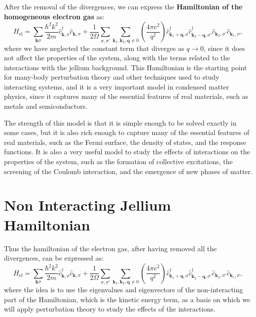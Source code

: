 After the removal of the divergences, we can express the \textbf{Hamiltonian of the homogeneous electron gas} as:
\[
    H_{\text{el}} = \sum_{\mathbf{k} \sigma} \frac{\hbar^2 k^2}{2m} \hat{c}_{\mathbf{k}, \sigma}^\dagger \hat{c}_{\mathbf{k}, \sigma} + \frac{1}{2\Omega} \sum_{\sigma, \sigma'} \sum_{\mathbf{k}_1, \mathbf{k}_2, \mathbf{q}\neq 0} \left( \frac{4 \pi e^2}{q^2} \right) \hat{c}_{\mathbf{k}_1 + \mathbf{q}, \sigma}^\dagger \hat{c}_{\mathbf{k}_2 - \mathbf{q}, \sigma'}^\dagger \hat{c}_{\mathbf{k}_2, \sigma'} \hat{c}_{\mathbf{k}_1, \sigma},
\]
where we have neglected the constant term that diverges as \(q \to 0\), since it does not affect the properties of the system, along with the terms related to the interactions with the jellium background. This Hamiltonian is the starting point for many-body perturbation theory and other techniques used to study interacting systems, and it is a very important model in condensed matter physics, since it captures many of the essential features of real materials, such as metals and semiconductors.

The strength of this model is that it is simple enough to be solved exactly in some cases, but it is also rich enough to capture many of the essential features of real materials, such as the Fermi surface, the density of states, and the response functions. It is also a very useful model to study the effects of interactions on the properties of the system, such as the formation of collective excitations, the screening of the Coulomb interaction, and the emergence of new phases of matter.

\section{Non Interacting Jellium Hamiltonian}

Thus the hamiltonian of the electron gas, after having removed all the divergences, can be expressed as:
\[
    H_{\text{el}} = \sum_{\mathbf{k} \sigma} \frac{\hbar^2 k^2}{2m} \hat{c}_{\mathbf{k}, \sigma}^\dagger \hat{c}_{\mathbf{k}, \sigma} + \frac{1}{2\Omega} \sum_{\sigma, \sigma'} \sum_{\mathbf{k}_1, \mathbf{k}_2, \mathbf{q}\neq 0} \left( \frac{4 \pi e^2}{q^2} \right) \hat{c}_{\mathbf{k}_1 + \mathbf{q}, \sigma}^\dagger \hat{c}_{\mathbf{k}_2 - \mathbf{q}, \sigma'}^\dagger \hat{c}_{\mathbf{k}_2, \sigma'} \hat{c}_{\mathbf{k}_1, \sigma},
\]
where the idea is to use the eigenvalues and eigenvectors of the non-interacting part of the Hamiltonian, which is the kinetic energy term, as a basis on which we will apply perturbation theory to study the effects of the interactions.

